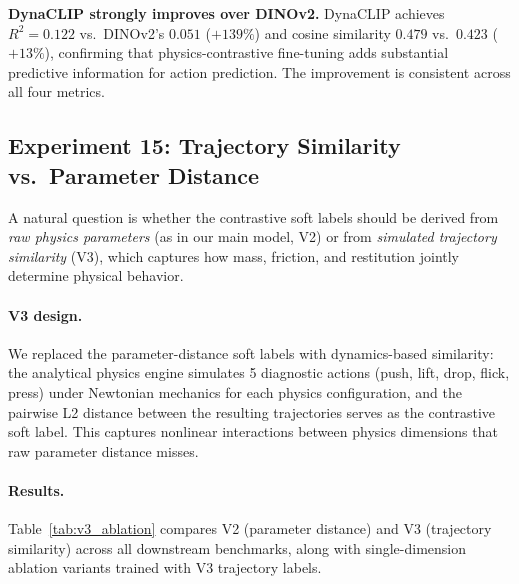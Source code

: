 \documentclass{article}
\newcommand{\methodname}{DynaCLIP}
\begin{document}
\textbf{DynaCLIP strongly improves over DINOv2.} \methodname{} achieves $R^2{=}0.122$ vs.\ DINOv2's $0.051$ ($+139\%$) and cosine similarity $0.479$ vs.\ $0.423$ ($+13\%$), confirming that physics-contrastive fine-tuning adds substantial predictive information for action prediction. The improvement is consistent across all four metrics.


\subsection{Experiment 15: Trajectory Similarity vs.\ Parameter Distance}
\label{sec:exp_trajectory_ablation}

A natural question is whether the contrastive soft labels should be derived from \emph{raw physics parameters} (as in our main model, V2) or from \emph{simulated trajectory similarity} (V3), which captures how mass, friction, and restitution jointly determine physical behavior.

\paragraph{V3 design.} We replaced the parameter-distance soft labels with dynamics-based similarity: the analytical physics engine simulates 5 diagnostic actions (push, lift, drop, flick, press) under Newtonian mechanics for each physics configuration, and the pairwise L2 distance between the resulting trajectories serves as the contrastive soft label. This captures nonlinear interactions between physics dimensions that raw parameter distance misses.

\paragraph{Results.} Table~\ref{tab:v3_ablation} compares V2 (parameter distance) and V3 (trajectory similarity) across all downstream benchmarks, along with single-dimension ablation variants trained with V3 trajectory labels.
\end{document}
